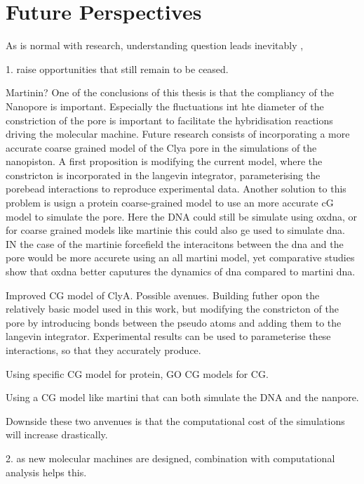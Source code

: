 \section{Future Perspectives}

As is normal with research, understanding  question leads inevitably ,

1.
raise
opportunities that still remain to be ceased.

Martinin?
One of the conclusions of this thesis is that the compliancy of the Nanopore is
important. Especially the fluctuations int hte diameter of the constriction of the pore
is important to facilitate the hybridisation reactions driving the molecular machine.
Future research consists of incorporating a more accurate coarse grained model of the
Clya pore in the simulations of the nanopiston. A first proposition is modifying the
current model, where the constricton is incorporated in the langevin integrator,
parameterising the porebead interactions to reproduce experimental data. Another solution
to this problem is usign a protein coarse-grained model to use an more accurate cG model
to simulate the pore. Here the DNA could still be simulate using oxdna, or for coarse
grained models like martinie this could also ge used to simulate dna. IN the case of the
martinie forcefield the interacitons between the dna and the pore would be more accurete
using an all martini model, yet comparative studies show that oxdna better caputures the
dynamics of dna compared to martini dna.


Improved CG model of ClyA. Possible avenues. Building futher opon the relatively basic
model used in this work, but modifying the constricton of the pore by introducing bonds
between the pseudo atoms and adding them to the langevin integrator. Experimental results
can be used to parameterise these interactions, so that they accurately produce.

Using specific CG model for protein, GO CG models for  CG.

Using a CG model like martini that can both simulate the DNA and the nanpore.


Downside these two anvenues is that the computational cost of the simulations will
increase drastically.

2.
as new molecular machines are designed, combination with computational analysis helps
this.
